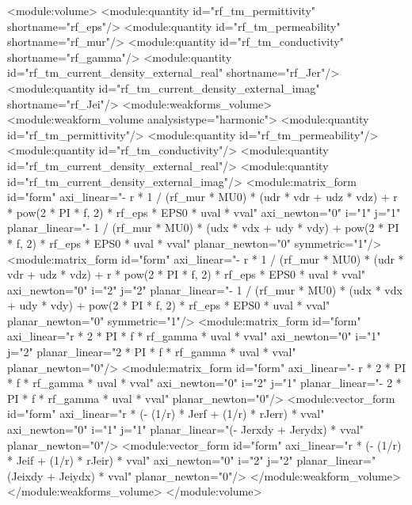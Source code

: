 \documentclass[12pt,a4paper,oneside]{article}
\numberwithin{equation}{section} %
\numberwithin{figure}{section} %
\numberwithin{table}{section} %
\begin{document}
\begin{spverbatim}
<module:volume>
    <module:quantity id="rf_tm_permittivity" shortname="rf_eps"/>
    <module:quantity id="rf_tm_permeability" shortname="rf_mur"/>
    <module:quantity id="rf_tm_conductivity" shortname="rf_gamma"/>
    <module:quantity id="rf_tm_current_density_external_real" shortname="rf_Jer"/>
    <module:quantity id="rf_tm_current_density_external_imag" shortname="rf_Jei"/>
    <module:weakforms_volume>
      <module:weakform_volume analysistype="harmonic">
        <module:quantity id="rf_tm_permittivity"/>
        <module:quantity id="rf_tm_permeability"/>
        <module:quantity id="rf_tm_conductivity"/>
        <module:quantity id="rf_tm_current_density_external_real"/>
        <module:quantity id="rf_tm_current_density_external_imag"/>
        <module:matrix_form id="form" axi_linear="- r * 1 / (rf_mur * MU0) * (udr * vdr + udz * vdz) + r * pow(2 * PI * f, 2) * rf_eps * EPS0 * uval * vval" axi_newton="0" i="1" j="1" planar_linear="- 1 / (rf_mur * MU0) * (udx * vdx + udy * vdy) + pow(2 * PI * f, 2) * rf_eps * EPS0 * uval * vval" planar_newton="0" symmetric="1"/>
        <module:matrix_form id="form" axi_linear="- r * 1 / (rf_mur * MU0) * (udr * vdr + udz * vdz) + r * pow(2 * PI * f, 2) * rf_eps * EPS0 * uval * vval" axi_newton="0" i="2" j="2" planar_linear="- 1 / (rf_mur * MU0) * (udx * vdx + udy * vdy) + pow(2 * PI * f, 2) * rf_eps * EPS0 * uval * vval" planar_newton="0" symmetric="1"/>
        <module:matrix_form id="form" axi_linear="r * 2 * PI * f * rf_gamma * uval * vval" axi_newton="0" i="1" j="2" planar_linear="2 * PI * f * rf_gamma * uval * vval" planar_newton="0"/>
        <module:matrix_form id="form" axi_linear="- r * 2 * PI * f * rf_gamma * uval * vval" axi_newton="0" i="2" j="1" planar_linear="- 2 * PI * f * rf_gamma * uval * vval" planar_newton="0"/>
        <module:vector_form id="form" axi_linear="r * (- (1/r) * Jerf + (1/r) * rJerr) * vval" axi_newton="0" i="1" j="1" planar_linear="(- Jerxdy + Jerydx) * vval" planar_newton="0"/>
        <module:vector_form id="form" axi_linear="r * (- (1/r) * Jeif + (1/r) * rJeir) * vval" axi_newton="0" i="2" j="2" planar_linear="(Jeixdy + Jeiydx) * vval" planar_newton="0"/>
     </module:weakform_volume>
    </module:weakforms_volume>
  </module:volume>
\end{spverbatim}
\end{document}
